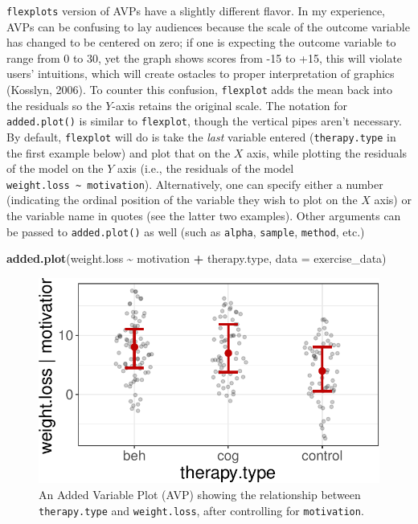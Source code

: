 \documentclass[
  man]{apa6}
\newenvironment{Shaded}{\begin{snugshade}}{\end{snugshade}}
\newcommand{\DataTypeTok}[1]{\textcolor[rgb]{0.13,0.29,0.53}{#1}}
\newcommand{\KeywordTok}[1]{\textcolor[rgb]{0.13,0.29,0.53}{\textbf{#1}}}
\newcommand{\NormalTok}[1]{#1}
\newcommand{\OperatorTok}[1]{\textcolor[rgb]{0.81,0.36,0.00}{\textbf{#1}}}
\newcommand{\StringTok}[1]{\textcolor[rgb]{0.31,0.60,0.02}{#1}}
\begin{document}
\texttt{flexplot\textquotesingle{}s} version of AVPs have a slightly different flavor. In my experience, AVPs can be confusing to lay audiences because the scale of the outcome variable has changed to be centered on zero; if one is expecting the outcome variable to range from 0 to 30, yet the graph shows scores from -15 to +15, this will violate users' intuitions, which will create ostacles to proper interpretation of graphics (Kosslyn, 2006). To counter this confusion, \texttt{flexplot} adds the mean back into the residuals so the \(Y\)-axis retains the original scale. The notation for \texttt{added.plot()} is similar to \texttt{flexplot}, though the vertical pipes aren't necessary. By default, \texttt{flexplot} will do is take the \emph{last} variable entered (\texttt{therapy.type} in the first example below) and plot that on the \(X\) axis, while plotting the residuals of the model on the \(Y\) axis (i.e., the residuals of the model \texttt{weight.loss\ \textasciitilde{}\ motivation}). Alternatively, one can specify either a number (indicating the ordinal position of the variable they wish to plot on the \(X\) axis) or the variable name in quotes (see the latter two examples). Other arguments can be passed to \texttt{added.plot()} as well (such as \texttt{alpha}, \texttt{sample}, \texttt{method}, etc.)

\small

\begin{Shaded}
\begin{Highlighting}[]
\KeywordTok{added.plot}\NormalTok{(weight.loss }\OperatorTok{\textasciitilde{}}\StringTok{ }\NormalTok{motivation }\OperatorTok{+}\StringTok{ }\NormalTok{therapy.type, }\DataTypeTok{data =}\NormalTok{ exercise\_data)}
\end{Highlighting}
\end{Shaded}

\begin{figure}
\centering
\includegraphics{flexplot_psychmeth_files/figure-latex/avp-1.pdf}
\caption{\label{fig:avp-1}An Added Variable Plot (AVP) showing the relationship between \texttt{therapy.type} and \texttt{weight.loss}, after controlling for \texttt{motivation}. \label{fig:avp}}
\end{figure}
\end{document}
